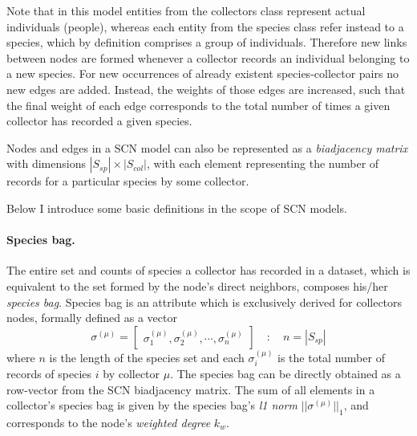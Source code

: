 \documentclass[a4paper]{article}
\begin{document}
Note that in this model entities from the collectors class represent actual individuals (people), whereas each entity from the species class refer instead to a species, which by definition comprises a group of individuals. 
Therefore new links between nodes are formed whenever a collector records an individual belonging to a new species. 
For new occurrences of already existent species-collector pairs no new edges are added. Instead, the weights of those edges are increased, such that the final weight of each edge corresponds to the total number of times a given collector has recorded a given species.

Nodes and edges in a SCN model can also be represented as a \textit{biadjacency matrix} with dimensions $|S_{sp}|\times|S_{col}|$, with each element representing the number of records for a particular species by some collector.

Below I introduce some basic definitions in the scope of SCN models.

\paragraph{Species bag.} 
The entire set and counts of species a collector has recorded in a dataset, which is equivalent to the set formed by the node's direct neighbors, composes his/her \textit{species bag}.
Species bag is an attribute which is exclusively derived for collectors nodes, formally defined as a vector
$$
\sigma^{(\mu)} =  \begin{bmatrix}
\sigma_1^{(\mu)}, \sigma_2^{(\mu)}, \cdots, \sigma_n^{(\mu)}
\end{bmatrix}  \quad : \quad 
n = |S_{sp}|
$$
where $n$ is the length of the species set and each $\sigma_i^{(\mu)}$ is the total number of records of species $i$ by collector $\mu$. 
The species bag can be directly obtained as a row-vector from the SCN biadjacency matrix.
The sum of all elements in a collector's species bag is given by the species bag's \textit{l1 norm} $|| \sigma^{(\mu)} ||_1$, and corresponds to the node's \textit{weighted degree} $k_w$.
 
\end{document}
